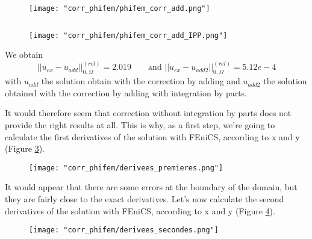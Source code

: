 \begin{minipage}{0.48\linewidth}
	\begin{figure}[H]
		\centering
		\texttt{[image: "corr\_phifem/phifem\_corr\_add.png"]}
		\label{corr_phifem_phifem_corr_add}
	\end{figure} 
\end{minipage} $\qquad$
\begin{minipage}{0.48\linewidth}
	\begin{figure}[H]
		\centering
		\texttt{[image: "corr\_phifem/phifem\_corr\_add\_IPP.png"]}
		\label{corr_phifem_phifem_corr_add_IPP}
	\end{figure} 
\end{minipage}

We obtain
\begin{equation*}
	||u_{ex}-u_{add}||_{0,\Omega}^{(rel)}=2.019 \qquad \text{and } ||u_{ex}-u_{add2}||_{0,\Omega}^{(rel)}=5.12e-4
\end{equation*}
with $u_{add}$ the solution obtain with the correction by adding and $u_{add2}$ the solution obtained with the correction by adding with integration by parts.

It would therefore seem that correction without integration by parts does not provide the right results at all. This is why, as a first step, we're going to calculate the first derivatives of the solution with FEniCS, according to x and y (Figure \ref{corr_phifem_derivees_premieres}).

\begin{figure}[H]
	\centering
	\texttt{[image: "corr\_phifem/derivees\_premieres.png"]}
	\label{corr_phifem_derivees_premieres}
\end{figure} 

It would appear that there are some errors at the boundary of the domain, but they are fairly close to the exact derivatives. Let's now calculate the second derivatives of the solution with FEniCS, according to x and y (Figure \ref{corr_phifem_derivees_secondes}).
	
\begin{figure}[H]
	\centering
	\texttt{[image: "corr\_phifem/derivees\_secondes.png"]}
	\label{corr_phifem_derivees_secondes}
\end{figure} 

